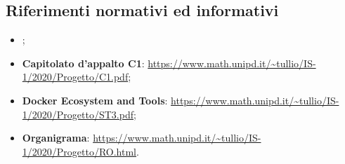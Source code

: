 \subsection{Riferimenti normativi ed informativi}
    \begin{itemize}
        \item \NdP{};
        \item \textbf{Capitolato d'appalto C1}: \url{https://www.math.unipd.it/~tullio/IS-1/2020/Progetto/C1.pdf};
        \item \textbf{Docker Ecosystem and Tools}: \url{https://www.math.unipd.it/~tullio/IS-1/2020/Progetto/ST3.pdf};
        \item \textbf{Organigrama}: \url{https://www.math.unipd.it/~tullio/IS-1/2020/Progetto/RO.html}.
    \end{itemize}